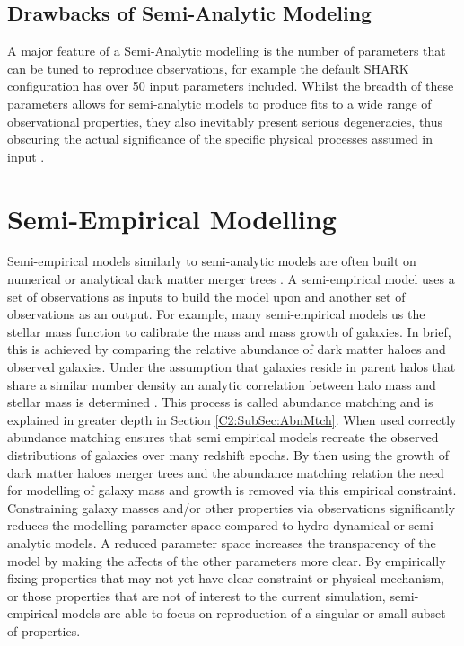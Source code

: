 \subsection{Drawbacks of Semi-Analytic Modeling}
A major feature of a Semi-Analytic modelling is the number of parameters that can be tuned to reproduce observations, for example the default SHARK configuration has over 50 input parameters included. Whilst the breadth of these parameters allows for semi-analytic models to produce fits to a wide range of observational properties, they also inevitably present serious degeneracies, thus obscuring the actual significance of the specific physical processes assumed in input \citep{Lapi2011DarkModels,Gonzalez2011Evolution4}.


\section{Semi-Empirical Modelling}
\label{sec:SEM}
Semi-empirical models similarly to semi-analytic models are often built on numerical or analytical dark matter merger trees \cite{Zavala2012}. A semi-empirical model uses a set of observations as inputs to build the model upon and another set of observations as an output. 
For example, many semi-empirical models us the stellar mass function to calibrate the mass and mass growth of galaxies. In brief, this is achieved by comparing the relative abundance of dark matter haloes and observed galaxies. Under the assumption that galaxies reside in parent halos that share a similar number density an analytic correlation between halo mass and stellar mass is determined \citep{Kravtsov2004TheDistribution,Shankar2006NewFormation}. This process is called abundance matching and is explained in greater depth in Section \ref{C2:SubSec:AbnMtch}. When used correctly abundance matching ensures that semi empirical models recreate the observed distributions of galaxies over many redshift epochs. By then using the growth of dark matter haloes merger trees and the abundance matching relation the need for modelling of galaxy mass and growth is removed via this empirical constraint. Constraining galaxy masses and/or other properties via observations significantly reduces the modelling parameter space compared to hydro-dynamical or semi-analytic models. A reduced parameter space increases the transparency of the model by making the affects of the other parameters more clear. By empirically fixing properties that may not yet have clear constraint or physical mechanism, or those properties that are not of interest to the current simulation, semi-empirical models are able to focus on reproduction of a singular or small subset of properties.

